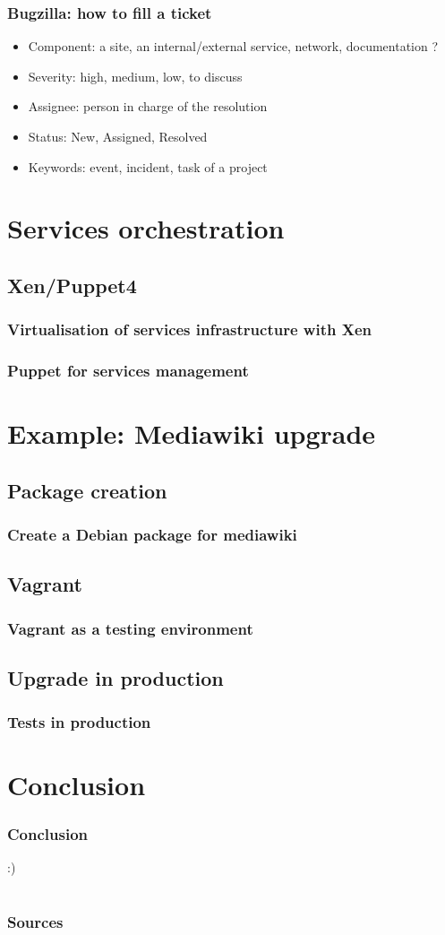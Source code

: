 \documentclass[11pt,compress]{beamer}
\begin{document}
\begin{frame}
\frametitle{Bugzilla: how to fill a ticket}
\begin{itemize}
\item Component: a site, an internal/external service, network, documentation ?
\item Severity: high, medium, low, to discuss
\item Assignee: person in charge of the resolution
\item Status: New, Assigned, Resolved
\item Keywords: event, incident, task of a project
\end{itemize}
\end{frame}

\section{Services orchestration}
\subsection{Xen/Puppet4}
\begin{frame}
\frametitle{Virtualisation of services infrastructure with Xen}
\end{frame}

\begin{frame}
\frametitle{Puppet for services management}
\end{frame}

\section{Example: Mediawiki upgrade}
\subsection{Package creation}
\begin{frame}
\frametitle{Create a Debian package for mediawiki}
\end{frame}

\subsection{Vagrant}
\begin{frame}
\frametitle{Vagrant as a testing environment}
\end{frame}

\subsection{Upgrade in production}
\begin{frame}
\frametitle{Tests in production}
\end{frame}

\section{Conclusion}
\begin{frame}
\frametitle{Conclusion}
:)
\end{frame}

\section*{}
\begin{frame}
\frametitle{Sources}

\end{frame}
\end{document}

